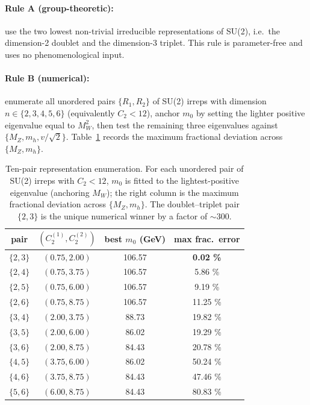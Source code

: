 \documentclass[11pt,a4paper]{article}
\newcommand{\Cas}{C_2}
\begin{document}
\paragraph{Rule A (group-theoretic):} use the two lowest non-trivial
irreducible representations of SU(2), i.e.\ the dimension-2 doublet and
the dimension-3 triplet. This rule is parameter-free and uses no
phenomenological input.

\paragraph{Rule B (numerical):} enumerate all unordered pairs
$\{R_1, R_2\}$ of SU(2) irreps with dimension $n \in \{2, 3, 4, 5, 6\}$
(equivalently $\Cas < 12$), anchor $m_0$ by setting the lighter
positive eigenvalue equal to $M_W^2$, then test the remaining three
eigenvalues against $\{M_Z, m_h, v/\sqrt{2}\}$. Table~\ref{tab:repsel}
records the maximum fractional deviation across $\{M_Z, m_h\}$.

\begin{table}[ht]
\centering
\small
\begin{tabular}{c c c c}
\toprule
pair & $(\Cas^{(1)}, \Cas^{(2)})$ & best $m_0$ (GeV) & max frac.\ error \\
\midrule
$\{2,3\}$ & $(0.75, 2.00)$ & 106.57 & \textbf{0.02 \%} \\
$\{2,4\}$ & $(0.75, 3.75)$ & 106.57 & 5.86 \% \\
$\{2,5\}$ & $(0.75, 6.00)$ & 106.57 & 9.19 \% \\
$\{2,6\}$ & $(0.75, 8.75)$ & 106.57 & 11.25 \% \\
$\{3,4\}$ & $(2.00, 3.75)$ & 88.73  & 19.82 \% \\
$\{3,5\}$ & $(2.00, 6.00)$ & 86.02  & 19.29 \% \\
$\{3,6\}$ & $(2.00, 8.75)$ & 84.43  & 20.78 \% \\
$\{4,5\}$ & $(3.75, 6.00)$ & 86.02  & 50.24 \% \\
$\{4,6\}$ & $(3.75, 8.75)$ & 84.43  & 47.46 \% \\
$\{5,6\}$ & $(6.00, 8.75)$ & 84.43  & 80.83 \% \\
\bottomrule
\end{tabular}
\caption{Ten-pair representation enumeration. For each unordered pair of
SU(2) irreps with $\Cas < 12$, $m_0$ is fitted to the lightest-positive
eigenvalue (anchoring $M_W$); the right column is the maximum
fractional deviation across $\{M_Z, m_h\}$. The doublet--triplet pair
$\{2,3\}$ is the unique numerical winner by a factor of $\sim 300$.}
\label{tab:repsel}
\end{table}
\end{document}

